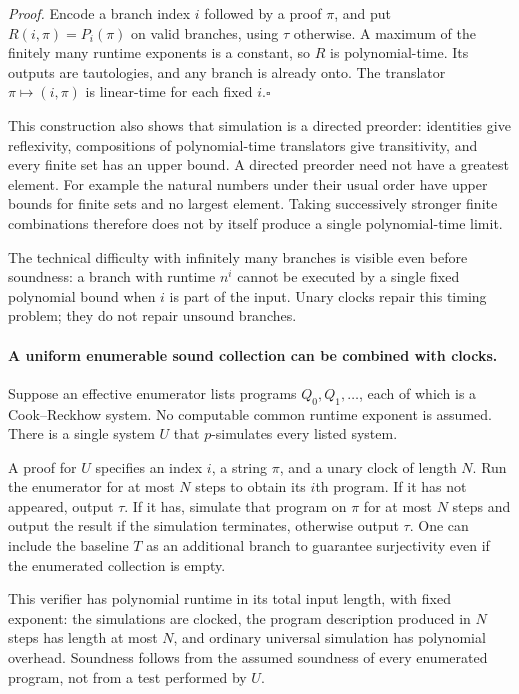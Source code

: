 \documentclass[11pt]{article}
\begin{document}
\emph{Proof.} Encode a branch index $i$ followed by a proof $\pi$, and
put $R(i,\pi)=P_i(\pi)$ on valid branches, using $\tau$ otherwise.
A maximum of the finitely many runtime exponents is a constant, so
$R$ is polynomial-time. Its outputs are tautologies, and any branch
is already onto. The translator $\pi\mapsto(i,\pi)$ is linear-time
for each fixed $i$.\hfill$\square$

This construction also shows that simulation is a directed preorder:
identities give reflexivity, compositions of polynomial-time translators
give transitivity, and every finite set has an upper bound. A directed
preorder need not have a greatest element. For example the natural
numbers under their usual order have upper bounds for finite sets and
no largest element. Taking successively stronger finite combinations
therefore does not by itself produce a single polynomial-time limit.

The technical difficulty with infinitely many branches is visible even
before soundness: a branch with runtime $n^i$ cannot be executed by a
single fixed polynomial bound when $i$ is part of the input. Unary
clocks repair this timing problem; they do not repair unsound branches.

\paragraph{A uniform enumerable sound collection can be combined with clocks.}
Suppose an effective enumerator lists programs $Q_0,Q_1,\ldots$, each
of which is a Cook--Reckhow system. No computable common runtime exponent
is assumed. There is a single system $U$ that $p$-simulates every listed
system.

A proof for $U$ specifies an index $i$, a string $\pi$, and a unary
clock of length $N$. Run the enumerator for at most $N$ steps to obtain
its $i$th program. If it has not appeared, output $\tau$. If it has,
simulate that program on $\pi$ for at most $N$ steps and output the
result if the simulation terminates, otherwise output $\tau$.
One can include the baseline $T$ as an additional branch to guarantee
surjectivity even if the enumerated collection is empty.

This verifier has polynomial runtime in its total input length, with
fixed exponent: the simulations are clocked, the program description
produced in $N$ steps has length at most $N$, and ordinary universal
simulation has polynomial overhead. Soundness follows from the assumed
soundness of every enumerated program, not from a test performed by $U$.
\end{document}
